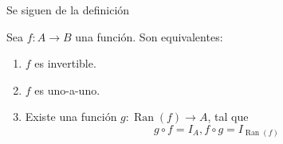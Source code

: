 Se siguen de la definici\'{o}n

\begin{theorem}
\label{caracterizainversa} Sea $f:A\longrightarrow B$ una funci\'{o}n. Son equivalentes:

\begin{enumerate}
\item $f$ es invertible.

\item $f$ es uno-a-uno.%
%


\item Existe una funci\'{o}n $g:\operatorname*{Ran}(f)\longrightarrow A$, tal
que
\begin{equation}
g\circ f=I_{A},f\circ g=I_{\operatorname*{Ran}(f)}%
\end{equation}

\end{enumerate}
\end{theorem}

